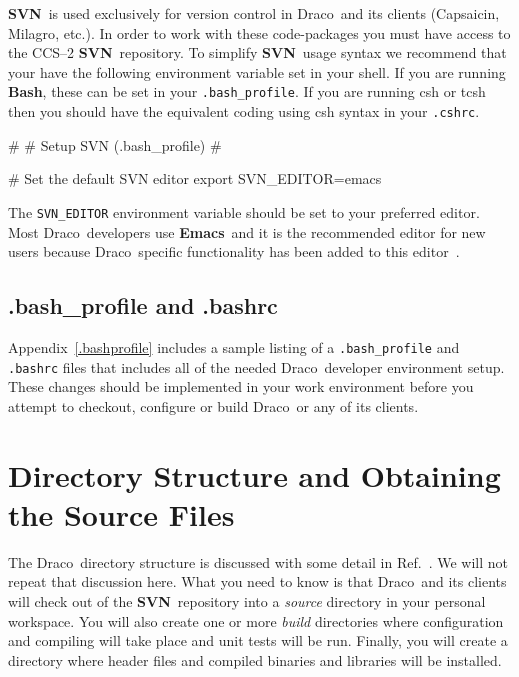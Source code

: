 \documentclass[11pt]{nmemo}
\newcommand{\comp}[1]{\normalfont\footnotesize\texttt{#1}\normalsize}
\newcommand{\draco}{{\normalfont\sffamily Draco}}
\newcommand{\capsaicin}{{\normalfont\sffamily Capsaicin}}
\newcommand{\milagro}{{\normalfont\sffamily Milagro}}
\newcommand{\svn}{{\normalfont\bfseries SVN}}
\newcommand{\emacs}{{\normalfont\bfseries Emacs}}
\newcommand{\bash}{{\normalfont\bfseries Bash}}
\newenvironment{codeExample} %
{\footnotesize 
  \VerbatimEnvironment
  \begin{SaveVerbatim}{\mycode}}%
  {\end{SaveVerbatim}%
  \noindent%
  \parashade[.950]{sharpcorners}{\gdef\outlineboxwidth{.5}%
    \UseVerbatim{\mycode}}\normalsize}
\begin{document}
\svn\ is used exclusively for version control in \draco\ and its
clients (\capsaicin, \milagro, etc.).  In order to work with
these code-packages you must have access to the CCS--2 \svn\ 
repository.  To simplify \svn\ usage syntax we recommend that your
have the following environment variable set in your shell.  If you
are running \bash, these can be set in your \comp{.bash\_profile}.
If you are running csh or tcsh then you should have the equivalent
coding using csh syntax in your \comp{.cshrc}.
%
\begin{codeExample}
#
# Setup SVN (.bash_profile)
#

# Set the default SVN editor
export SVN_EDITOR=emacs
\end{codeExample}
%

%
The \comp{SVN\_EDITOR} environment variable should be set to your
preferred editor.  Most \draco\ developers use \emacs\ and it is the
recommended editor for new users because \draco\ specific
functionality has been added to this editor~\cite{xtm:9909}.

\subsection{.bash\_profile and .bashrc}

Appendix~\ref{.bashprofile} includes a sample listing of a
\comp{.bash\_profile} and \comp{.bashrc} files that includes all of
the needed \draco\ developer environment setup.  These changes should
be implemented in your work environment before you attempt to
checkout, configure or build \draco\ or any of its clients.


\section{Directory Structure and Obtaining the Source Files}

The \draco\ directory structure is discussed with some detail in
Ref.~\cite{draco-build}.  We will not repeat that discussion here.
What you need to know is that \draco\ and its clients will check out
of the \svn\ repository into a \emph{source} directory in your
personal workspace.  You will also create one or more \emph{build}
directories where configuration and compiling will take place and unit
tests will be run.  Finally, you will create a directory where header
files and compiled binaries and libraries will be installed.
\end{document}
